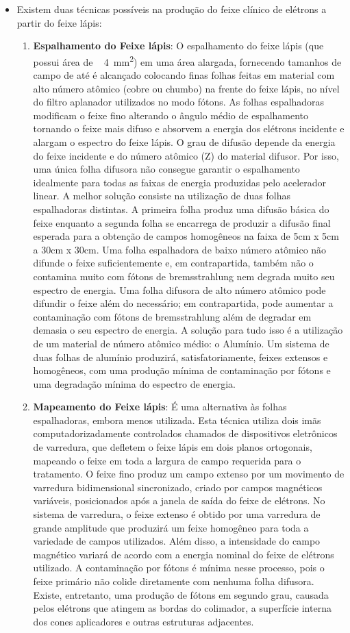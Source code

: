 \documentclass[11pt,a4paper]{article}
\begin{document}
	\begin{itemize}
		\item Existem duas técnicas possíveis na produção do feixe clínico de elétrons a partir do feixe lápis:		
			\begin{enumerate}
				\item \textbf{Espalhamento do Feixe lápis}: O espalhamento do feixe lápis (que possui área de ~ \qty{4}{mm^2})  em uma área alargada, fornecendo tamanhos de campo de até  é alcançado colocando finas folhas feitas em material com alto número atômico (cobre ou chumbo) na frente do feixe lápis, no nível do filtro aplanador utilizados no modo fótons. As folhas espalhadoras modificam o feixe fino alterando o ângulo médio de espalhamento tornando o feixe mais difuso e absorvem a energia dos elétrons incidente e alargam o espectro do feixe lápis. O grau de difusão depende da energia do feixe incidente e do número atômico (Z) do material difusor. Por isso, uma única folha difusora não consegue garantir o espalhamento idealmente para todas as faixas de energia produzidas pelo acelerador linear. A melhor solução consiste na utilização de duas folhas espalhadoras distintas. A primeira folha produz uma difusão básica do feixe enquanto a segunda folha se encarrega de produzir a difusão final esperada para a obtenção de campos homogêneos na faixa de 5cm x 5cm a 30cm x 30cm. Uma folha espalhadora de baixo número atômico não difunde o feixe suficientemente e, em contrapartida, também não o contamina muito com fótons de bremsstrahlung nem degrada muito seu espectro de energia. Uma folha difusora de alto número atômico pode difundir o feixe além do necessário; em contrapartida, pode aumentar a contaminação com fótons de bremsstrahlung além de degradar em demasia o seu espectro de energia. A solução para tudo isso é a utilização de um material de número atômico médio: o Alumínio. Um sistema de duas folhas de alumínio produzirá, satisfatoriamente, feixes extensos e homogêneos, com uma produção mínima de contaminação por fótons e uma degradação mínima do espectro de energia.
				\item \textbf{Mapeamento do Feixe lápis}: É uma alternativa às folhas espalhadoras, embora menos utilizada. Esta técnica utiliza dois imãs computadorizadamente controlados chamados de dispositivos eletrônicos de varredura, que defletem o feixe lápis em dois planos ortogonais, mapeando o feixe em toda a largura de campo requerida para o tratamento.  O feixe fino produz um campo extenso por um movimento de varredura bidimensional sincronizado, criado por campos magnéticos variáveis, posicionados após a janela de saída do feixe de elétrons. No sistema de varredura, o feixe extenso é obtido por uma varredura de grande amplitude que produzirá um feixe homogêneo para toda a variedade de campos utilizados. Além disso, a intensidade do campo magnético variará de acordo com a energia nominal do feixe de elétrons utilizado. A contaminação por fótons é mínima nesse processo, pois o feixe primário não colide diretamente com nenhuma folha difusora. Existe, entretanto, uma produção de fótons em segundo grau, causada pelos elétrons que atingem as bordas do colimador, a superfície interna dos cones aplicadores e outras estruturas adjacentes.

\end{enumerate}
\end{itemize}
\end{document}
